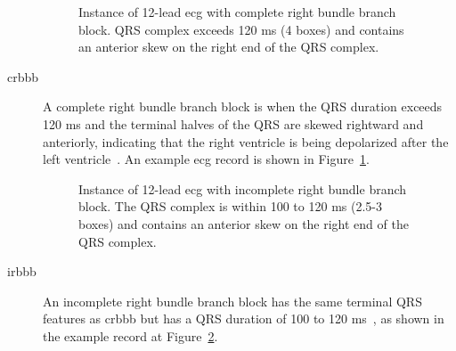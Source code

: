 \documentclass[\main/thesis.tex]{subfiles}
\begin{document}
\begin{description}
    \begin{figure}[H]
        \centering
        \caption{Instance of 12-lead \gls{ecg} with complete right bundle branch block. QRS complex exceeds 120 ms (4 boxes) and contains an anterior skew on the right end of the QRS complex.}
        \label{fig:full_CRBBB}
    \end{figure} 
    \item[\gls{crbbb}] A complete right bundle branch block is when the QRS duration exceeds 120 ms and the terminal halves of the QRS are skewed rightward and anteriorly, indicating that the right ventricle is being depolarized after the left ventricle~\cite{ecg-utah-lesson}. An example \gls{ecg} record is shown in Figure~\ref{fig:full_CRBBB}.

    \begin{figure}[H]
        \centering
        \caption{Instance of 12-lead \gls{ecg} with incomplete right bundle branch block. The QRS complex is within 100 to 120 ms (2.5-3 boxes) and contains an anterior skew on the right end of the QRS complex.}
        \label{fig:full_IRBBB}
    \end{figure} 
    \item[\gls{irbbb}] An incomplete right bundle branch block has the same terminal QRS features as \gls{crbbb} but has a QRS duration of 100 to 120 ms~\cite{ecg-utah-lesson}, as shown in the example record at Figure~\ref{fig:full_IRBBB}.


\end{description}
\end{document}

